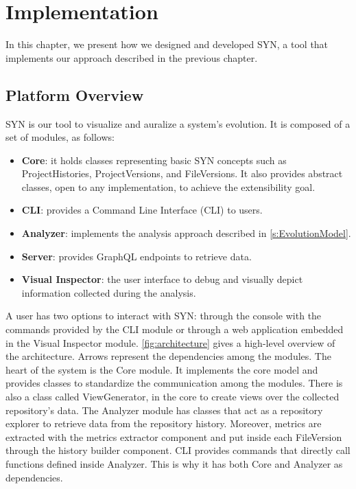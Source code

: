 \chapter[Implementation]{Implementation}
\graphicspath{ {images/implementation} }
In this chapter, we present how we designed and developed SYN, a tool that implements our approach described in the previous chapter.

\section{Platform Overview}
SYN is our tool to visualize and auralize a system's evolution. 
It is composed of a set of modules, as follows:
\begin{itemize}
    \item \textbf{Core}: it holds classes representing basic SYN concepts such as ProjectHistories, ProjectVersions, and FileVersions. It also provides abstract classes, open to any implementation, to achieve the extensibility goal.
    \item \textbf{CLI}: provides a Command Line Interface (CLI) to users.
    \item \textbf{Analyzer}: implements the analysis approach described in \autoref{s:EvolutionModel}. 
    \item \textbf{Server}: provides GraphQL endpoints to retrieve data. 
    \item \textbf{Visual Inspector}: the user interface to debug and visually depict information collected during the analysis. 
\end{itemize}


A user has two options to interact with SYN: through the console with the commands provided by the CLI module 
or through a web application embedded in the Visual Inspector module.
\autoref{fig:architecture} gives a high-level overview of the architecture. Arrows represent the dependencies among the modules.
The heart of the system is the Core module. It implements the core model and provides classes to standardize the communication among the modules.
There is also a class called ViewGenerator, in the core to create views over the collected repository's data.
The Analyzer module has classes that act as a repository explorer to retrieve data from the repository history. 
Moreover, metrics are extracted with the metrics extractor component and put inside each FileVersion through the history builder component. 
CLI provides commands that directly call functions defined inside Analyzer. 
This is why it has both Core and Analyzer as dependencies. 

